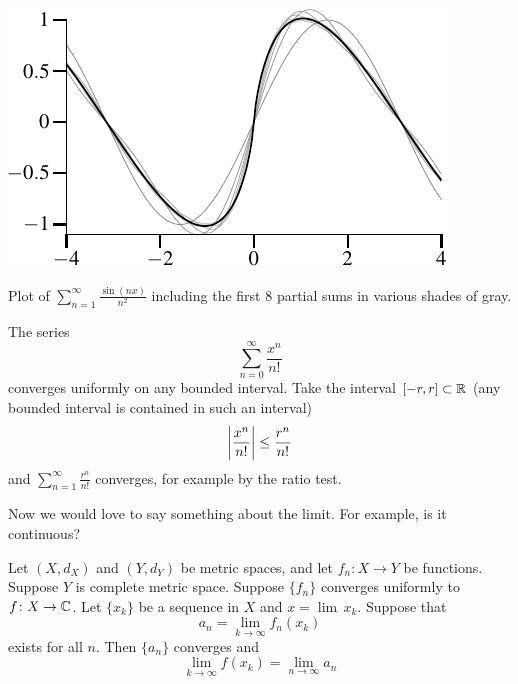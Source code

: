 \begin{myfigureht}
\includegraphics{figures/fouriersern2}
\caption{Plot of 
$\sum_{n=1}^\infty \frac{\sin(n x)}{n^2}$ including
the first 8 partial sums in various shades of gray.\label{fig:fouriersern2}}
\end{myfigureht}

\begin{example}
The series
\begin{equation*}
\sum_{n=0}^\infty \frac{x^n}{n!} 
\end{equation*}
converges uniformly on any bounded interval.
Take the interval $[-r,r] \subset {\mathbb{R}}$ (any bounded interval
is contained in such an interval)
\begin{equation*}
\left\lvert {\frac{x^n}{n!} } \right\rvert \leq 
\frac{r^n}{n!}
\end{equation*}
and 
$\sum_{n=1}^\infty \frac{r^n}{n!}$ converges, for example by the ratio test.
\end{example}

Now we would love to say something about the limit.  For example, is it
continuous?


\begin{prop} \label{prop:uniformswitch}
Let $(X,d_X)$ and $(Y,d_Y)$ be metric spaces, and let
$f_n \colon X \to Y$ be functions.
Suppose $Y$ is complete metric space.
Suppose $\{ f_n \}$ converges uniformly to $f \colon X \to {\mathbb{C}}$.  
Let $\{ x_k \}$ be a sequence in $X$ and $x = \lim \, x_k$.  Suppose
that
\begin{equation*}
a_n = \lim_{k \to \infty} f_n(x_k)
\end{equation*}
exists for all $n$.  Then
$\{a_n\}$ converges and 
\begin{equation*}
\lim_{k \to \infty} f(x_k) = \lim_{n\to\infty} a_n
\end{equation*}
\end{prop}

